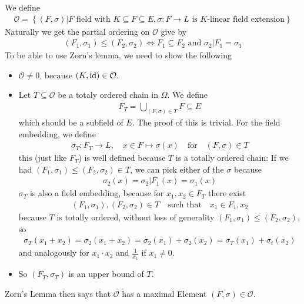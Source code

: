 We define 
\begin{align*}
	\mathcal{O} = \left\{(F,\sigma) \big\vert F \text{ field with } K \subseteq F \subseteq E, \sigma: F \to L \text{ is $K$-linear field extension}\right\}		
\end{align*}
Naturally we get the partial ordering on $\mathcal{O}$ give by
\begin{align*}
	(F_1,\sigma_1) \leq (F_2,\sigma_2) \iff F_1 \subseteq F_2 \text{ and } \sigma_2|F_1 = \sigma_1
\end{align*}
To be able to use Zorn's lemma, we need to show the following
\begin{itemize}
	\item $\mathcal{O} \neq 0$, because $(K, \operatorname{id}) \in \mathcal{O}$.
	\item Let $T \subseteq \mathcal{O}$ be a totaly ordered chain in $\Omega$. We define
		\begin{align*}
			F_T = \bigcup_{(F, \sigma) \in T} F \subseteq E
		\end{align*}
		which should be a subfield of $E$. The proof of this is trivial. For the field embedding, we define
		\begin{align*}
			\sigma_T: F_T \to L, \quad x \in F \mapsto \sigma(x) \quad \text{for} \quad (F,\sigma) \in T
		\end{align*}
		this (just like $F_T$) is well defined because $T$ is a totally ordered chain: If we had $(F_1, \sigma_1) \leq (F_2,\sigma_2) \in T$, we can pick either of the $\sigma$ because 
	\begin{align*}
		\sigma_2(x) = \sigma_2|F_1(x) = \sigma_1(x)
	\end{align*}
	$\sigma_T$ is also a field embedding, because for $x_1,x_2 \in F_T$ there exist
	\begin{align*}
		(F_1,\sigma_1), (F_2,\sigma_2) \in T \quad \text{such that} \quad x_1 \in F_1, x_2
	\end{align*}
	because $T$ is totally ordered, without loss of generality $(F_1, \sigma_1) \leq (F_2,\sigma_2)$, so
	\begin{align*}
		\sigma_T(x_1 + x_2) = \sigma_2(x_1 + x_2) = \sigma_2(x_1) + \sigma_2(x_2) = \sigma_T(x_1) + \sigma_t(x_2)
	\end{align*}
	and analogously for $x_1 \cdot x_2$ and $\frac{1}{x_1}$ if $x_1 \neq 0$.
\item So $(F_T,\sigma_T)$ is an upper bound of $T$.
\end{itemize}
Zorn's Lemma then says that $\mathcal{O}$ has a maximal Element $(F,\sigma) \in \mathcal{O}$.


